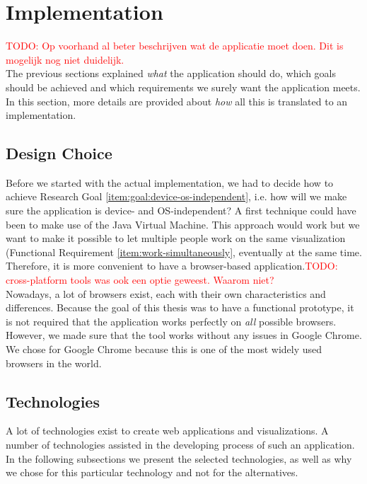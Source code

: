 \chapter{Implementation}\label{ch:implementation}

\textcolor{red}{TODO: Op voorhand al beter beschrijven wat de applicatie moet doen. Dit is mogelijk nog niet duidelijk.}\\
The previous sections explained \textit{what} the application should do, which goals should be achieved and which requirements we surely want the application meets. In this section, more details are provided about \textit{how} all this is translated to an implementation.

\section{Design Choice}
Before we started with the actual implementation, we had to decide how to achieve Research Goal \ref{item:goal:device-os-independent}, i.e. how will we make sure the application is device- and OS-independent? A first technique could have been to make use of the Java Virtual Machine. This approach would work but we want to make it possible to let multiple people work on the same visualization (Functional Requirement \ref{item:work-simultaneously}, eventually at the same time. Therefore, it is more convenient to have a browser-based application.\textcolor{red}{TODO: cross-platform tools was ook een optie geweest. Waarom niet?}\\

Nowadays, a lot of browsers exist, each with their own characteristics and differences. Because the goal of this thesis was to have a functional prototype, it is not required that the application works perfectly on \textit{all} possible browsers. However, we made sure that the tool works without any issues in Google Chrome. We chose for Google Chrome because this is one of the most widely used browsers in the world.

\section{Technologies}\label{sec:technologies}
A lot of technologies exist to create web applications and visualizations. A number of technologies assisted in the developing process of such an application. In the following subsections we present the selected technologies, as well as why we chose for this particular technology and not for the alternatives.

